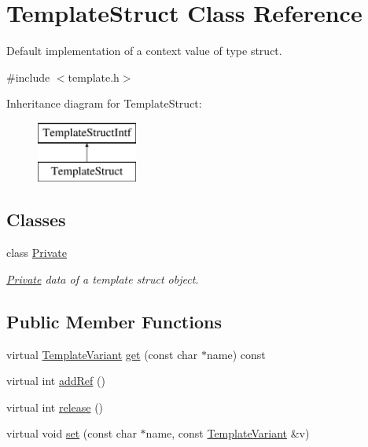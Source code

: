 \hypertarget{class_template_struct}{}\section{Template\+Struct Class Reference}
\label{class_template_struct}


Default implementation of a context value of type struct.  




{\ttfamily \#include $<$template.\+h$>$}

Inheritance diagram for Template\+Struct\+:\begin{figure}[H]
\begin{center}
\leavevmode
\includegraphics[height=2.000000cm]{class_template_struct}
\end{center}
\end{figure}
\subsection*{Classes}
\begin{DoxyCompactItemize}
\item 
class \mbox{\hyperlink{class_template_struct_1_1_private}{Private}}
\begin{DoxyCompactList}\small\item\em \mbox{\hyperlink{class_template_struct_1_1_private}{Private}} data of a template struct object. \end{DoxyCompactList}\end{DoxyCompactItemize}
\subsection*{Public Member Functions}
\begin{DoxyCompactItemize}
\item 
virtual \mbox{\hyperlink{class_template_variant}{Template\+Variant}} \mbox{\hyperlink{class_template_struct_a3186868e4c1ee4cec1d1abcdfb5bac70}{get}} (const char $\ast$name) const
\item 
virtual int \mbox{\hyperlink{class_template_struct_a3fc49f671cd0c2d963f50977f3842541}{add\+Ref}} ()
\item 
virtual int \mbox{\hyperlink{class_template_struct_a4ef2dfe170fe108e52949b9e9c69d41d}{release}} ()
\item 
virtual void \mbox{\hyperlink{class_template_struct_a657ed741aec6c31883d86b211ec27e5c}{set}} (const char $\ast$name, const \mbox{\hyperlink{class_template_variant}{Template\+Variant}} \&v)
\end{DoxyCompactItemize}
